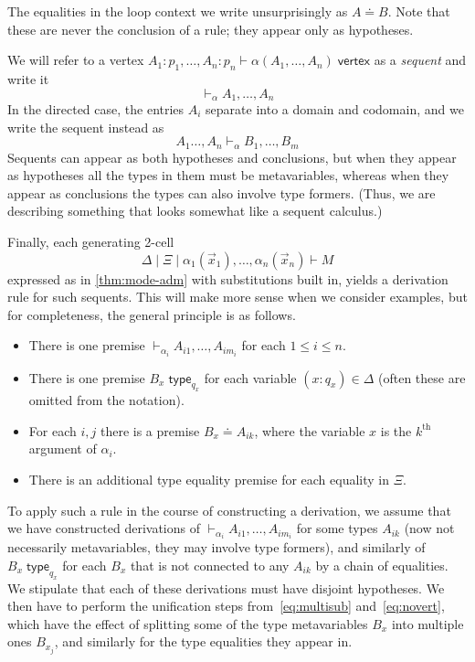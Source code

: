 \documentclass{article}
\theoremstyle{definition}
\theoremstyle{remark}
\def\vertex{\;\mathsf{vertex}}
\def\type{\;\mathsf{type}}
\let\types\vdash
\begin{document}
The equalities in the loop context we write unsurprisingly as $A\doteq B$.
Note that these are never the conclusion of a rule; they appear only as hypotheses.

We will refer to a vertex $A_1:p_1, \dots ,A_n:p_n \types \alpha(A_1,\dots,A_n) \vertex$ as a \emph{sequent} and write it
\[ \types_\alpha A_1,\dots,A_n \]
In the directed case, the entries $A_i$ separate into a domain and codomain, and we write the sequent instead as
\[ A_1\dots,A_n \types_\alpha B_1,\dots,B_m\]
Sequents can appear as both hypotheses and conclusions, but when they appear as hypotheses all the types in them must be metavariables, whereas when they appear as conclusions the types can also involve type formers.
(Thus, we are describing something that looks somewhat like a sequent calculus.)

Finally, each generating 2-cell
\[ \Delta \mid \Xi \mid \alpha_1(\vec x_1),\dots, \alpha_n(\vec x_n) \types M \]
expressed as in \cref{thm:mode-adm} with substitutions built in, yields a derivation rule for such sequents.
This will make more sense when we consider examples, but for completeness, the general principle is as follows.
\begin{itemize}
\item There is one premise $\types_{\alpha_i} A_{i1},\dots,A_{i m_i}$ for each $1\le i\le n$.
\item There is one premise $B_x\type_{q_x}$ for each variable $(x:q_x)\in \Delta$ (often these are omitted from the notation).
\item For each $i,j$ there is a premise $B_{x} \doteq A_{ik}$, where the variable $x$ is the $k^{\mathrm{th}}$ argument of $\alpha_i$.
\item There is an additional type equality premise for each equality in $\Xi$.
\end{itemize}
To apply such a rule in the course of constructing a derivation, we assume that we have constructed derivations of $\types_{\alpha_i} A_{i1},\dots,A_{i m_i}$ for some types $A_{i k}$ (now not necessarily metavariables, they may involve type formers), and similarly of $B_x \type_{q_x}$ for each $B_x$ that is not connected to any $A_{i k}$ by a chain of equalities.
We stipulate that each of these derivations must have disjoint hypotheses.
We then have to perform the unification steps from~\eqref{eq:multisub} and~\eqref{eq:novert}, which have the effect of splitting some of the type metavariables $B_x$ into multiple ones $B_{x_j}$, and similarly for the type equalities they appear in.
\end{document}
